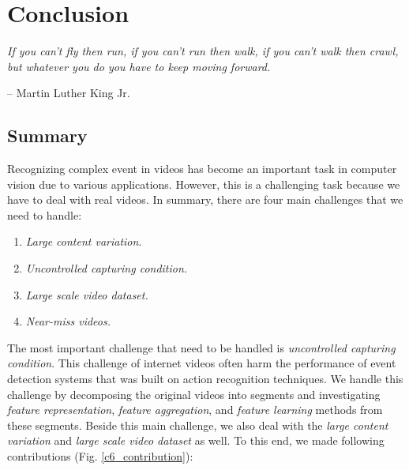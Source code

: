 \chapter{Conclusion}
\label{chapter6}

\epigraph{\textit{If you can't fly then run, if you can't run then walk, if you can't walk then crawl, but whatever you do you have to keep moving forward.}}{ -- Martin Luther King Jr.}

\ifpdf
    \graphicspath{{Chapter6/Figs/Raster/}{Chapter6/Figs/PDF/}{Chapter6/Figs/}}
\else
    \graphicspath{{Chapter6/Figs/Vector/}{Chapter6/Figs/}}
\fi

\section{Summary}

Recognizing complex event in videos has become an important task in computer vision due to various applications. However, this is a challenging task because we have to deal with real videos. In summary, there are four main challenges that we need to handle:
\begin{enumerate}
	\itemsep0em 
	\item \textit{Large content variation}.
	\item \textit{Uncontrolled capturing condition.}
	\item \textit{Large scale video dataset.}	
	\item \textit{Near-miss videos.}
\end{enumerate}
	
  The most important challenge that need to be handled is \textit{uncontrolled capturing condition}. This challenge of internet videos often harm the performance of event detection systems that was built on action recognition techniques. We handle this challenge by decomposing the original videos into segments and investigating \textit{feature representation}, \textit{feature aggregation}, and \textit{feature learning} methods from these segments. Beside this main challenge, we also deal with the \textit{large content variation} and \textit{large scale video dataset} as well. To this end, we made following contributions (Fig. \ref{c6_contribution}):


